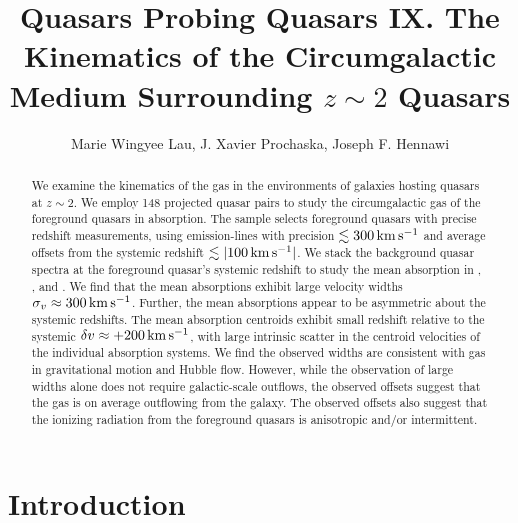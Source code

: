 \documentclass[iop]{emulateapj}
\begin{document}
\title{Quasars Probing Quasars IX. The Kinematics of the Circumgalactic Medium Surrounding
$z\sim2$ Quasars}

\author{Marie Wingyee Lau, J. Xavier Prochaska,
Joseph F. Hennawi
}

\begin{abstract}
We examine the kinematics of the gas in the environments of galaxies hosting quasars at $z\sim2$.
We employ 148 projected quasar pairs to study the circumgalactic gas of the foreground quasars in
absorption. The sample selects foreground quasars with precise redshift measurements, using
emission-lines with precision $\lesssim300\,{\rm km\,s^{-1}}$ and average offsets from the
systemic redshift $\lesssim|100\,{\rm km\,s^{-1}}|$. We stack the background quasar spectra at the
foreground quasar's systemic redshift to study the mean absorption in , ,
and .
We find that the mean absorptions exhibit large velocity widths
$\sigma_v\approx300\,{\rm km\,s^{-1}}$. Further, the mean absorptions appear to be asymmetric about
the systemic redshifts. The mean absorption centroids exhibit small redshift relative to the
systemic $\delta v\approx+200\,{\rm km\,s^{-1}}$, with large intrinsic scatter in the centroid
velocities of the individual absorption systems.
We find the observed widths are consistent with gas in gravitational
motion and Hubble flow. However, while the observation of large widths alone does not require
galactic-scale outflows, the observed offsets suggest that the gas is on average outflowing from the
galaxy. The observed offsets also suggest that the ionizing radiation from the foreground quasars
is anisotropic and/or intermittent.
\end{abstract}



\section{Introduction}
\label{sec:introduction}
\end{document}
